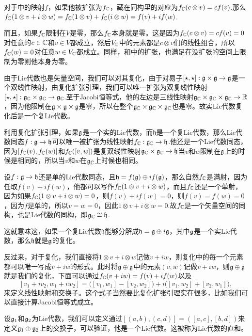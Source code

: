 对于中的映射$f$，如果他被扩张为$f_{\mathbb{C}}$，藏在同构里的对应为$f_{\mathbb{C}}(c\otimes v)=cf(v)$.那么$f_{\mathbb{C}}(1\otimes v+i\otimes w)=f_{\mathbb{C}}(1\otimes v)+f_{\mathbb{C}}(i\otimes w)=f(v)+if(w)$.

而且，如果$f_{\mathbb{C}}$限制在$V$是零，那么$f_{\mathbb{C}}$本身就是零。这是因为$f_{\mathbb{C}}(c\otimes v)=cf(v)=0$对任意的$c\in \mathbb{C}$和$v\in V$都成立，然后$V_{\mathbb{C}}$中的元素都是$c\otimes v$们的线性组合，所以$f_{\mathbb{C}}(w)=0$对任意$w\in V_{\mathbb{C}}$都成立。同样，和中的扩张，也满足在没扩张的空间上限制为零则他本身为零。

\para 由于Lie代数也是矢量空间，我们可以对其复化，由于对易子$[\star,\star]:{\mathfrak{g}}\times {\mathfrak{g}}\to {\mathfrak{g}}$是一个双线性映射，由复化扩张引理，我们可以唯一扩张为双复线性映射$[\star,\star]:{\mathfrak{g}}_{\mathbb{C}}\times {\mathfrak{g}}_{\mathbb{C}}\to {\mathfrak{g}}_{\mathbb{C}}$.至于Jacobi恒等式，他的左边是三线性映射${\mathfrak{g}}_{\mathbb{C}}\times {\mathfrak{g}}_{\mathbb{C}}\times {\mathfrak{g}}_{\mathbb{C}}\to\mathbb{R}$，因为他限制在${\mathfrak{g}}\times {\mathfrak{g}}\times {\mathfrak{g}}$是零，所以在整个${\mathfrak{g}}_{\mathbb{C}}\times {\mathfrak{g}}_{\mathbb{C}}\times {\mathfrak{g}}_{\mathbb{C}}$也是零。故实Lie代数复化后是一个复Lie代数。

\para 利用复化扩张引理，如果${\mathfrak{g}}$是一个实的Lie代数，而$\mathfrak{h}$是一个复Lie代数，那么Lie代数同态$f:{\mathfrak{g}}\to \mathfrak{h}$可以唯一被扩张为线性映射$f_{\mathbb{C}}:{\mathfrak{g}}_{\mathbb{C}}\to \mathfrak{h}$.他还是一个Lie代数同态，因为$[f_{\mathbb{C}}(v),f_{\mathbb{C}}(w)]$和$f_{\mathbb{C}}([v,w])$是复双线性映射${\mathfrak{g}}_{\mathbb{C}}\times {\mathfrak{g}}_{\mathbb{C}}\to\mathfrak{h}$当$v$和$w$限制在${\mathfrak{g}}$上的时候是相同的，所以当$v$和$w$在${\mathfrak{g}}_{\mathbb{C}}$上时候也相同。

设$f:{\mathfrak{g}}\to\mathfrak{h}$还是单的Lie代数同态，且$\mathfrak{h}=f({\mathfrak{g}})\oplus if({\mathfrak{g}})$，那么自然$f_{\mathbb{C}}$是满射，因为任取$f(v)+if(w)$，他都可以写作$f_{\mathbb{C}}(1\otimes v+i\otimes w)$，而且$f_{\mathbb{C}}$还是一个单射，因为如果$f_{\mathbb{C}}(1\otimes v+i\otimes w)=0$，则$f(v)+if(w)=0$，则$f(v)=f(w)=0$，因为$f$是单的，所以$v=w=0$，因此$1\otimes v+i\otimes w=0$.故$f_{\mathbb{C}}$是一个矢量空间的同构，也是Lie代数的同构，即${\mathfrak{g}}_{\mathbb{C}}\cong \mathfrak{h}$. 

这就意味这，如果一个复Lie代数$\mathfrak{h}$能够分解成$\mathfrak{h}={\mathfrak{g}}\oplus i{\mathfrak{g}}$，其中${\mathfrak{g}}$是一个实Lie代数，那么$\mathfrak{h}$就是${\mathfrak{g}}$的复化。

反过来，对于复化，我们直接将$1\otimes v+i\otimes w$记做$v+iw$，则复化中的每一个元素都可以唯一写成$v+iw$的形式。此时将${\mathfrak{g}}\oplus {\mathfrak{g}}$中的元素$(v,w)$记做$v+iw$，则${\mathfrak{g}}\oplus {\mathfrak{g}}$就是我们的复化，下面可以通过$f_{\mathbb{C}}(v+iw)=f(v)+if(w)$以及
\[
	[v_1+iv_2,w_1+iw_2]=\bigl([v_1,w_1]-[v_2,w_2]\bigr)+i\bigl([v_1,w_2]+[v_2,w_1]\bigr),
\]
来定义线性映射和交换子。这个式子当然要比复化扩张引理实在很多，比如我们可以直接计算Jacobi恒等式成立。

\para 设${\mathfrak{g}}_1$和${\mathfrak{g}}_2$为Lie代数，我们可以定义通过$[(a,b),(c,d)]=\left([a,c],[b,d]\right)$来定义${\mathfrak{g}}_1\oplus {\mathfrak{g}}_2$上的交换子，可以验证，他是一个Lie代数。这被称为Lie代数的直和。

